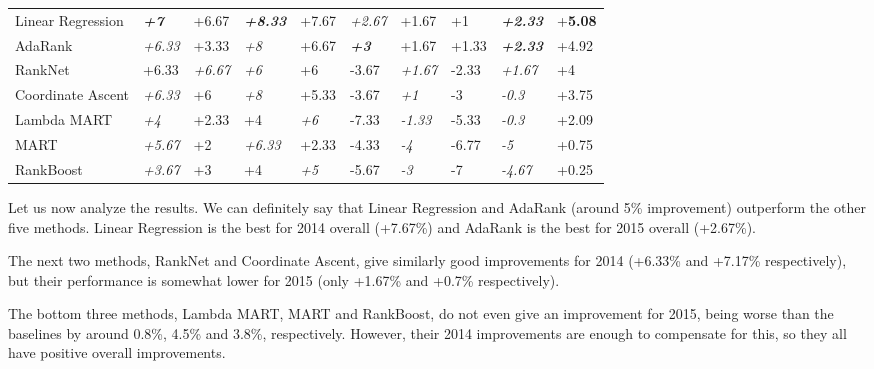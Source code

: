 \begin{table}[h!]
{\begin{tabular}{@{}llllllllll@{}}
Linear Regression & \textit{\textbf{+7}} & +6.67             & \textit{\textbf{+8.33}}   & +7.67              	& \textit{+2.67}       	& +1.67    		& +1          & \textit{\textbf{+2.33}}   & +\textbf{5.08}  \\
AdaRank           & \textit{+6.33}       & +3.33             & \textit{+8}               & +6.67              	& \textit{\textbf{+3}}	& +1.67         	& +1.33       & \textit{\textbf{+2.33}}   & +4.92  \\
RankNet           & +6.33             	 & \textit{+6.67}    & \textit{+6}               & +6                 	& -3.67       		& \textit{+1.67}        & -2.33       & \textit{+1.67}            & +4  \\
Coordinate Ascent & \textit{+6.33}       & +6                & \textit{+8}               & +5.33              	& -3.67      		& \textit{+1}           & -3          & \textit{-0.3}             & +3.75  \\
Lambda MART	  & \textit{+4}		 & +2.33	     & +4		         & \textit{+6}	   	& -7.33			& \textit{-1.33}	& -5.33	      & \textit{-0.3}		  & +2.09  \\
MART	 	  & \textit{+5.67}	 & +2		     & \textit{+6.33}	         & +2.33		& -4.33			& \textit{-4}		& -6.77	      & \textit{-5}		  & +0.75 \\
RankBoost	  & \textit{+3.67}	 & +3		     & +4		         & \textit{+5}		& -5.67			& \textit{-3}		& -7	      & \textit{-4.67}		  & +0.25 \\

\bottomrule
\end{tabular}%
}
\end{table}

Let us now analyze the results. We can definitely say that Linear Regression and AdaRank (around 5\% improvement)
outperform the other five methods. Linear Regression is the best for 2014 overall (+7.67\%) and
AdaRank is the best for 2015 overall (+2.67\%).

The next two methods, RankNet and Coordinate Ascent, give similarly good
improvements for 2014 (+6.33\% and +7.17\% respectively), but their performance is somewhat lower
for 2015 (only +1.67\% and +0.7\% respectively).

The bottom three methods, Lambda MART, MART and RankBoost, do not even give an improvement for 2015, being worse
than the baselines by around 0.8\%, 4.5\% and 3.8\%, respectively. However, their 2014 improvements are enough to compensate
for this, so they all have positive overall improvements.

